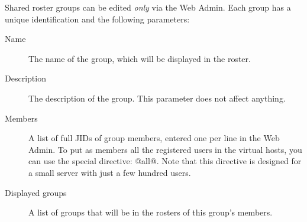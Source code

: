 \documentclass[a4paper,10pt]{book}
\begin{document}
Shared roster groups can be edited \emph{only} via the Web Admin. Each group
has a unique identification and the following parameters:
\begin{description}
\item[Name] The name of the group, which will be displayed in the roster.
\item[Description] The description of the group. This parameter does not affect
  anything.
\item[Members] A list of full JIDs of group members, entered one per line in
  the Web Admin.
  To put as members all the registered users in the virtual hosts,
  you can use the special directive: @all@.
  Note that this directive is designed for a small server with just a few hundred users.
\item[Displayed groups] A list of groups that will be in the rosters of this
  group's members.
\end{description}
\end{document}
